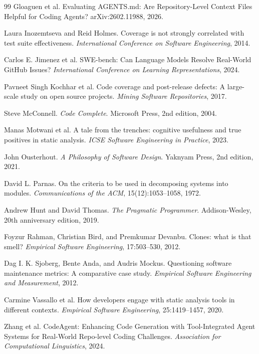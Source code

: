 \documentclass[11pt]{article}
\begin{document}
\begin{thebibliography}{99}
Gloaguen et al.
\newblock Evaluating AGENTS.md: Are Repository-Level Context Files Helpful for
Coding Agents?
\newblock arXiv:2602.11988, 2026.

Laura Inozemtseva and Reid Holmes.
\newblock Coverage is not strongly correlated with test suite effectiveness.
\newblock \emph{International Conference on Software Engineering}, 2014.

Carlos E. Jimenez et al.
\newblock SWE-bench: Can Language Models Resolve Real-World GitHub Issues?
\newblock \emph{International Conference on Learning Representations}, 2024.

Pavneet Singh Kochhar et al.
\newblock Code coverage and post-release defects: A large-scale study on open
source projects.
\newblock \emph{Mining Software Repositories}, 2017.

Steve McConnell.
\newblock \emph{Code Complete}.
\newblock Microsoft Press, 2nd edition, 2004.

Manas Motwani et al.
\newblock A tale from the trenches: cognitive usefulness and true positives in
static analysis.
\newblock \emph{ICSE Software Engineering in Practice}, 2023.

John Ousterhout.
\newblock \emph{A Philosophy of Software Design}.
\newblock Yaknyam Press, 2nd edition, 2021.

David L. Parnas.
\newblock On the criteria to be used in decomposing systems into modules.
\newblock \emph{Communications of the ACM}, 15(12):1053--1058, 1972.

Andrew Hunt and David Thomas.
\newblock \emph{The Pragmatic Programmer}.
\newblock Addison-Wesley, 20th anniversary edition, 2019.

Foyzur Rahman, Christian Bird, and Premkumar Devanbu.
\newblock Clones: what is that smell?
\newblock \emph{Empirical Software Engineering}, 17:503--530, 2012.

Dag I. K. Sjoberg, Bente Anda, and Audris Mockus.
\newblock Questioning software maintenance metrics: A comparative case study.
\newblock \emph{Empirical Software Engineering and Measurement}, 2012.

Carmine Vassallo et al.
\newblock How developers engage with static analysis tools in different
contexts.
\newblock \emph{Empirical Software Engineering}, 25:1419--1457, 2020.

Zhang et al.
\newblock CodeAgent: Enhancing Code Generation with Tool-Integrated Agent
Systems for Real-World Repo-level Coding Challenges.
\newblock \emph{Association for Computational Linguistics}, 2024.

\end{thebibliography}
\end{document}

